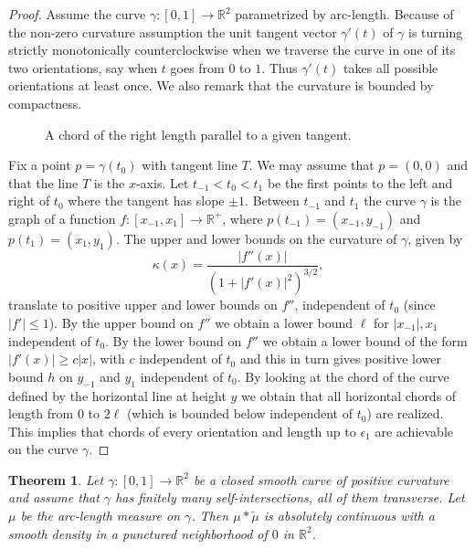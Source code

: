 \documentclass[12pt,a4paper,oneside]{amsart}
\newtheorem{theorem}{Theorem}
\theoremstyle{definition}
\newcommand{\Abs}[1]{{\left|{#1}\right|}}
\newcommand{\RR}{{\mathbb R}}
\newcommand{\wt}[1]{\widetilde{#1}}
\newcounter{rem}
\begin{document}
\begin{proof}
Assume the curve $\gamma:[0,1] \to \RR^2$ parametrized by arc-length.
Because of the non-zero curvature assumption the unit tangent vector $\gamma'(t)$ of $\gamma$ is turning strictly monotonically counterclockwise when we traverse the curve in one of its two orientations, say when $t$ goes from {$0$ to $1$}. Thus $\gamma'(t)$ takes all possible orientations at least once. {We also remark that the curvature is bounded by compactness.}

\begin{figure}[h]
\ifdefined\SMART\resizebox{4cm}{!}{}\else

\fi
\caption{A chord of the right length parallel to a given tangent.}\label{fig:chord}
\end{figure}

Fix a point $p = \gamma(t_0)$ with tangent line {$T$}. We may assume that $p=(0, 0)$ and that the line {$T$} is the $x$-axis. Let $t_{-1} < t_0 < t_1$ be the first points to the left and right of $t_0$ where the tangent has slope $\pm1$. Between $t_{-1}$ and $t_1$ the curve $\gamma$ is the graph of a function $f:[x_{-1}, x_1] \to \RR^+$, where $p(t_{-1}) = (x_{-1}, y_{-1})$ and $p(t_1) = (x_1, y_1)$.
The upper and lower bounds on the curvature of $\gamma$, given by
$$
\kappa(x) = \frac{\Abs{f''(x)}}{\left(1+\Abs{f'(x)}^2\right)^{3/2}},
$$
translate to positive upper and lower bounds on $f''$, independent of $t_0$ (since $\Abs{f'}\le 1$). By the upper bound on $f''$ we obtain a lower bound $\ell$ for $\Abs{x_{-1}}, x_1$ independent of $t_0$. By the lower bound on $f''$ we obtain a lower bound of the form $\Abs{f'(x)} \ge c \Abs{x}$, with $c$ independent of $t_0$ and this in turn gives positive lower bound $h$ on $y_{-1}$ and $y_1$ independent of $t_0$. By looking at the chord of the curve defined by the horizontal line at height $y$ we obtain that all horizontal chords of length from 0 to $2\ell$ (which is bounded below independent of $t_0$) are realized.
This implies that chords of every orientation and length up to $\epsilon_1$ are achievable on the curve $\gamma$.
\end{proof}



\begin{theorem}\label{theorem-smooth}
    Let $\gamma: [0,1]\to \RR^2$ be a closed smooth curve of positive curvature and {assume that} $\gamma$ has {finitely many self-intersections, all of them transverse}. Let $\mu$ be the arc-length measure on $\gamma$. Then $\mu\ast\wt\mu$ is absolutely continuous with a smooth density in a {punctured} neighborhood of $0$ in $\RR^2$. 
\end{theorem}
\end{document}

